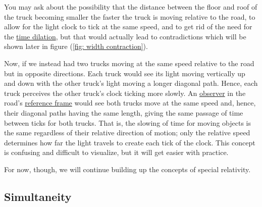 You may ask about the possibility that the distance between the floor and roof of the truck becoming smaller the faster the truck is moving relative to the road, to allow for the light clock to tick at the same speed, and to get rid of the need for the \hyperlink{def-time-dilation}{time dilation}, but that would actually lead to contradictions which will be shown later in figure (\ref{fig: width contraction}).

Now, if we instead had two trucks moving at the same speed relative to the road but in opposite directions.
Each truck would see its light moving vertically up and down with the other truck's light moving a longer diagonal path.
Hence, each truck perceives the other truck's clock ticking more slowly.
An \hyperlink{def-observer}{observer} in the road's \hyperlink{def-Reference-frame}{reference frame} would see both trucks move at the same speed and, hence, their diagonal paths having the same length, giving the same passage of time between ticks for both trucks.
That is, the slowing of time for moving objects is the same regardless of their relative direction of motion; only the relative speed determines how far the light travels to create each tick of the clock.
This concept is confusing and difficult to visualize, but it will get easier with practice.


For now, though, we will continue building up the concepts of special relativity.


\subsection{Simultaneity} \label{subsect: Simultaneity}

